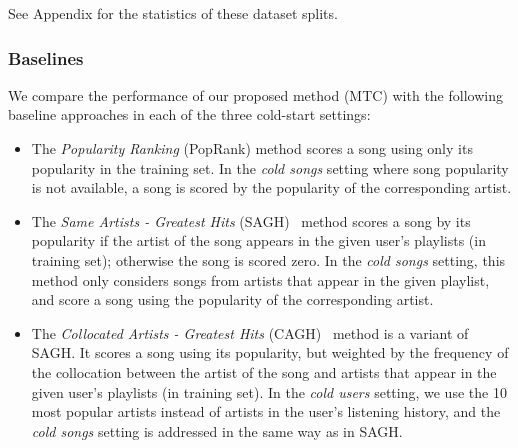 See Appendix for the statistics of these dataset splits.


%



\subsubsection{Baselines}
We compare the performance of our proposed method (\ie MTC) %
with the following %
baseline approaches in each of the three cold-start settings:
\begin{itemize}
\item The {\it Popularity Ranking} (PopRank) method scores a song using only its popularity in the training set.
      In the \emph{cold songs} setting where song popularity is not available, 
      a song is scored by the popularity of the corresponding artist.
\item The {\it Same Artists - Greatest Hits} (SAGH)~\cite{mcfee2012million} method scores a song
      by its popularity if the artist of the song appears in the given user's playlists (in training set);
      otherwise the song is scored zero.
      In the {\it cold songs} setting, this method only considers songs from artists that appear in the given playlist,
      and score a song using the popularity of the corresponding artist.
\item The {\it Collocated Artists - Greatest Hits} (CAGH)~\cite{bonnin2013evaluating} method is a variant of SAGH.
      It scores a song using its popularity, but weighted by the frequency of the collocation between the artist of the song
      and artists that appear in the given user's playlists (in training set).
      In the \emph{cold users} setting, we use the 10 most popular artists instead of artists 
      in the user's listening history, and the \emph{cold songs} setting is addressed in the same way as in SAGH.

\end{itemize}
